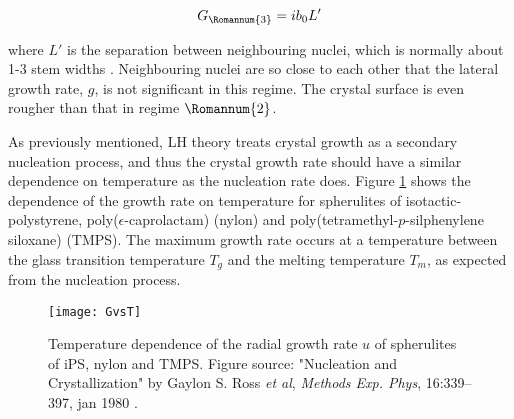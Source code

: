 \begin{equation}
\label{eqn_regime3}
G_{\Romannum{3}} = i b_{0} L'
\end{equation}

\noindent
where $L'$ is the separation between neighbouring nuclei, which is normally about 1-3 stem widths \cite{Hoffman1983}. Neighbouring nuclei are so close to each other that the lateral growth rate, $g$, is not significant in this regime. The crystal surface is even rougher than that in regime $\Romannum{2}$.

As previously mentioned, LH theory treats crystal growth as a secondary nucleation process, and thus the crystal growth rate should have a similar dependence on temperature as the nucleation rate does. Figure \ref{fig:growth rate vs T} shows the dependence of the growth rate on temperature for spherulites of isotactic-polystyrene, poly($\epsilon$-caprolactam) (nylon) and poly(tetramethyl-$p$-silphenylene siloxane) (TMPS). The maximum growth rate occurs at a temperature between the glass transition temperature $T_{g}$ and the melting temperature $T_{m}$, as expected from the nucleation process.

\begin{figure}[H]
\center
\texttt{[image: GvsT]}
\caption[Temperature dependence of the radial growth rate $u$ of spherulites of iPS, nylon and TMPS.]{Temperature dependence of the radial growth rate $u$ of spherulites of iPS, nylon and TMPS. Figure source: "Nucleation and Crystallization" by Gaylon S. Ross \textit{et al}, \textit{Methods Exp. Phys}, 16:339–397, jan 1980 \cite{Ross1980}.}
\label{fig:growth rate vs T}
\end{figure}




